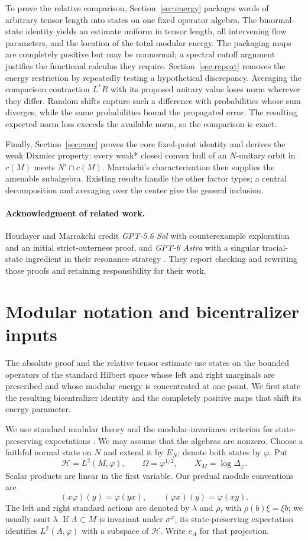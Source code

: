 \documentclass[11pt]{article}
\theoremstyle{definition}
\newcommand{\HH}{\mathcal H}
\begin{document}
To prove the relative comparison, Section~\ref{sec:energy} packages words
of arbitrary tensor length into states on one fixed operator algebra.
The binormal-state identity yields an estimate uniform in tensor length,
all intervening flow parameters, and the location of the total modular
energy. The packaging maps are completely positive but may be nonnormal;
a spectral cutoff argument justifies the functional calculus they require.
Section~\ref{sec:repeat} removes the energy restriction by repeatedly testing
a hypothetical discrepancy. Averaging the comparison contraction $L^*R$
with its proposed unitary value loses norm wherever they differ.
Random shifts capture such a difference with probabilities
whose sum diverges, while the same probabilities bound the propagated
error. The resulting expected norm loss exceeds the available norm, so the
comparison is exact.

Finally, Section~\ref{sec:core} proves the core fixed-point identity and
derives the weak Dixmier property: every weak* closed convex hull of an
$N$-unitary orbit in $c(M)$ meets $N'\cap c(M)$. Marrakchi's
characterization then supplies the amenable subalgebra.
Existing results handle the other factor types; a central decomposition
and averaging over the center give the general inclusion.

\paragraph{Acknowledgment of related work.}
Houdayer and Marrakchi credit \emph{GPT-5.6 Sol} with counterexample
exploration and an initial strict-outerness proof, and \emph{GPT-6 Astra}
with a singular tracial-state ingredient in their resonance strategy
\cite[p.~7]{HoudayerMarrakchi2026}. They report checking and rewriting those
proofs and retaining responsibility for their work.
\section{Modular notation and bicentralizer inputs}\label{sec:background}
The absolute proof and the relative tensor estimate use states on the bounded
operators of the standard Hilbert space whose left and right marginals are
prescribed and whose modular energy is concentrated at one point. We first state the resulting bicentralizer identity and the completely
positive maps that shift its energy parameter.

We use standard modular theory \cite{Takesaki2003} and the
modular-invariance criterion for state-preserving expectations
\cite{Takesaki1972}.
We may assume that the algebras are nonzero. Choose a faithful normal state
on $N$ and extend it by $E_N$; denote both states by $\varphi$. Put
\[
 \HH=L^2(M,\varphi),\qquad \Omega=\varphi^{1/2},\qquad
 X_M=\log\Delta_\varphi.
\]
Scalar products are linear in the first variable. Our predual module
conventions are
\[
 (x\varphi)(y)=\varphi(yx),\qquad
 (\varphi x)(y)=\varphi(xy).
\]
The left and right standard
actions are denoted by $\lambda$ and $\rho$, with $\rho(b)\xi=\xi b$;
we usually omit $\lambda$. If $A\subset M$ is invariant under
$\sigma^\varphi$, its state-preserving expectation identifies $L^2(A,\varphi)$
with a subspace of $\HH$. Write $e_A$ for that projection.
\end{document}
